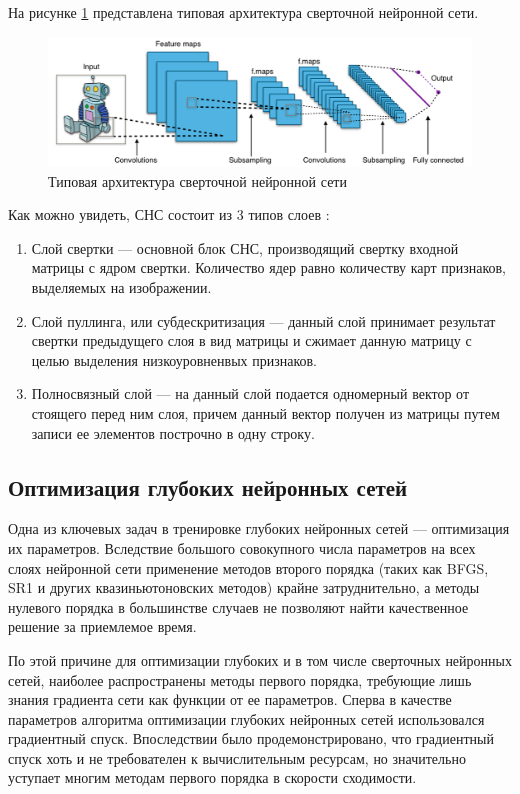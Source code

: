 На рисунке \ref{cnn} представлена типовая архитектура сверточной нейронной сети.

\begin{figure}[!h]
	\centering
	\includegraphics[scale=0.35]{assets/typical_cnn.png}
	\caption{Типовая архитектура сверточной нейронной сети}
	\label{cnn}
\end{figure}

Как можно увидеть, СНС состоит из 3 типов слоев \cite{cnn, cnn2, cnn3}:

\begin{enumerate}
    \item Слой свертки --- основной блок СНС, производящий свертку входной матрицы с ядром свертки. Количество ядер равно количеству карт признаков, выделяемых на изображении.
    \item Слой пуллинга, или субдескритизация --- данный слой принимает результат свертки предыдущего слоя в вид матрицы и сжимает данную матрицу с целью выделения низкоуровненвых признаков.
    \item Полносвязный слой --- на данный слой подается одномерный вектор от стоящего перед ним слоя, причем данный вектор получен из матрицы путем записи ее элементов построчно в одну строку.
\end{enumerate}

\subsection{Оптимизация глубоких нейронных сетей}

Одна из ключевых задач в тренировке глубоких нейронных сетей --- оптимизация их параметров. Вследствие большого совокупного числа параметров на всех слоях нейронной сети применение методов второго порядка (таких как BFGS, SR1 и других квазиньютоновских методов) крайне затруднительно, а методы нулевого порядка в большинстве случаев не позволяют найти качественное решение за приемлемое время.

По этой причине для оптимизации глубоких и в том числе сверточных нейронных сетей, наиболее распространены методы первого порядка, требующие лишь знания градиента сети как функции от ее параметров. Сперва в качестве параметров алгоритма оптимизации глубоких нейронных сетей использовался градиентный спуск. Впоследствии было продемонстрировано, что градиентный спуск хоть и не требователен к вычислительным ресурсам, но значительно уступает многим методам первого порядка в скорости сходимости.


